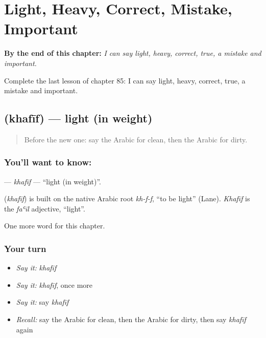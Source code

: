 
\chapter{Light, Heavy, Correct, Mistake, Important}
\label{ch:ar-light-heavy-correct-mistake-important}

\begin{chapteropening}
\textbf{By the end of this chapter:} \emph{I can say light, heavy, correct, true, a mistake and important.}

Complete the last lesson of chapter 85: I can say light, heavy, correct, true, a mistake and important.
\end{chapteropening}

\section[\texorpdfstring{\ar{خفيف} (khafīf)}{خفيف (khafīf)}]{ (khafīf) — light (in weight)}

\label{lesson:AR-C85-khafif}



\begin{quote}
Before the new one: say the Arabic for clean, then the Arabic for dirty.
\end{quote}

\subsection*{You'll want to know: }
\textbf{} — \emph{khafīf} — \textquotedblleft{}light (in weight)\textquotedblright{}.

\begin{cousinweb}
\textbf{} (\emph{khafīf}) is built on the native Arabic root \emph{kh-f-f}, \textquotedblleft{}to be light\textquotedblright{} (Lane). \emph{Khafīf} is the \emph{faʿīl} adjective, \textquotedblleft{}light\textquotedblright{}.
\end{cousinweb}

\begin{grammarlens}[title={What you've built}]
One more word for this chapter.
\end{grammarlens}

\subsection*{Your turn}
\begin{itemize}
\raggedright
  \item \emph{Say it:} \emph{khafīf}
  \item \emph{Say it:} \emph{khafīf}, once more
  \item \emph{Say it:} say \emph{khafīf}
  \item \emph{Recall:} say the Arabic for clean, then the Arabic for dirty, then say \emph{khafīf} again
\end{itemize}

